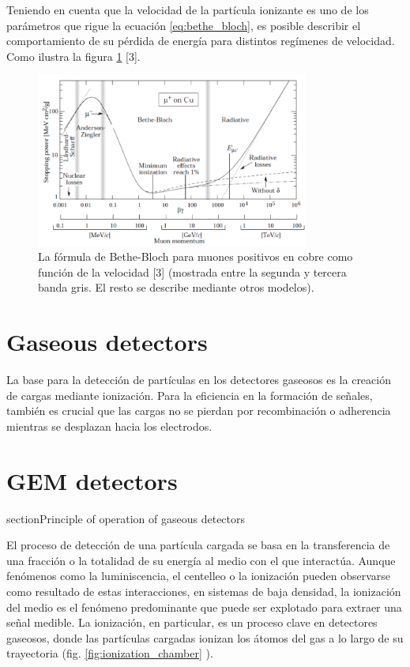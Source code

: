 \documentclass[]{book}
\begin{document}
\noindent Teniendo en cuenta que la velocidad de la partícula ionizante es uno de los parámetros que rigue la ecuación \ref{eq:bethe_bloch}, es posible describir el comportamiento de su pérdida de energía para distintos regímenes de velocidad. Como ilustra la figura \ref{fig:bethe_b} [3].

\begin{figure}[h]
    \centering
    \includegraphics[width=0.8\textwidth]{bethe_bloch.PNG}
    \caption{La fórmula de Bethe-Bloch para muones positivos en cobre como función de la velocidad [3] (mostrada entre la segunda y tercera banda gris. El resto se describe mediante otros modelos).}
    \label{fig:bethe_b}

\end{figure}

\section{Gaseous detectors}

\noindent La base para la detección de partículas en los detectores gaseosos es la creación de cargas mediante ionización. Para la eficiencia en la formación de señales, también es crucial que las cargas no se pierdan por recombinación o adherencia mientras se desplazan hacia los electrodos.

\section{GEM detectors}

section{Principle of operation of gaseous detectors}

\noindent El proceso de detección de una partícula cargada se basa en la transferencia de una fracción o la totalidad de su energía al medio con el que interactúa. Aunque fenómenos como la luminiscencia, el centelleo o la ionización pueden observarse como resultado de estas interacciones, en sistemas de baja densidad, la ionización del medio es el fenómeno predominante que puede ser explotado para extraer una señal medible. La ionización, en particular, es un proceso clave en detectores gaseosos, donde las partículas cargadas ionizan los átomos del gas a lo largo de su trayectoria (fig. \ref{fig:ionization_chamber} ).
\end{document}
